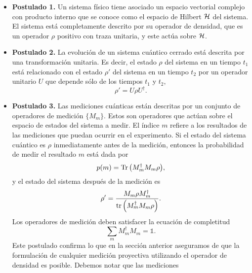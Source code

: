 \begin{itemize}
	\item[] \textbf{Postulado 1.} Un sistema físico tiene asociado un espacio vectorial complejo
	con producto interno que se conoce como el espacio de Hilbert $\mathcal{H}$ del
	sistema. El sistema está completamente descrito por su operador de densidad,
	que es un operador $\rho$ positivo con traza unitaria, y este actúa sobre 
	$\mathcal{H}$. 
	\item[] \textbf{Postulado 2.} La evolución de un sistema cuántico cerrado está descrita por una transformación
	unitaria. Es decir, el estado $\rho$ del sistema en un tiempo $t_1$ está 
	relacionado con el estado $\rho'$ del sistema en un tiempo $t_2$ por un operador
	unitario $U$ que depende sólo de los tiempos $t_1$ y $t_2$,
	\begin{equation}
	\rho'=U\rho U^{\dagger}.
	\label{eq:postulate1}
	\end{equation}
	\item[] \textbf{Postulado 3.} Las mediciones cuánticas están descritas
por un conjunto de 
	operadores de medición $\{M_m\}$. Estos son operadores que actúan sobre el espacio 
	de estados del sistema a medir. El índice $m$ refiere a los resultados
	de las mediciones que puedan ocurrir en el experimento. Si el estado del sistema
	cuántico es $\rho$ inmediatamente antes de la medición, entonces la probabilidad
	de medir el resultado $m$ está dada por
	\begin{equation}
	p(m)=\Tr \qty(M_m^{\dagger}M_m\rho),
	\label{eq:postulate2_prob}
	\end{equation}						
	y el estado del sistema después de la medición es
	\begin{equation}
	\rho'=\frac{M_m\rho M_m^{\dagger}}{\tr \qty(M_m^{\dagger}M_m\rho)}.
	\label{eq:postulate2_rhoPrime}
	\end{equation}	
	Los operadores de medición deben satisfacer la ecuación de completitud
	\begin{equation}
	\sum _m M_m^{\dagger}M_m=\mathbb{1}.
	\label{eq:postulate2_completeness}
	\end{equation}
	Este postulado confirma lo que en la sección anterior aseguramos
	de que la formulación de cualquier medición proyectiva utilizando el 
	operador de densidad es posible. Debemos notar que las mediciones

\end{itemize}
